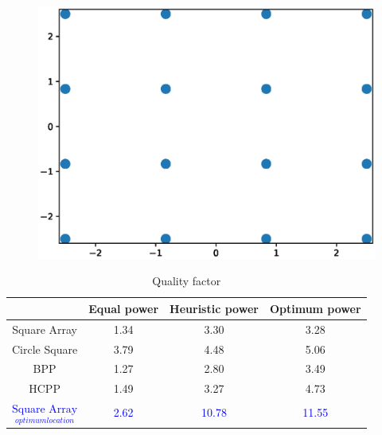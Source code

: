 \documentclass{beamer}
\theoremstyle{remark}
\begin{document}
\begin{frame}
\vfill
\begin{figure}
\includegraphics[scale=.25]{sq_opt_loc}
\end{figure}
\vfill
\begin{table}[]
\centering
\caption{Quality factor}
\begin{tabular}{|c|c|c|c|}
 \hline
 & Equal power & Heuristic power & Optimum power   \\
 \hline  
Square Array & 1.34 & 3.30 & 3.28   \\
 \hline 
Circle Square & 3.79 & 4.48 &  5.06 \\
 \hline
BPP & 1.27 & 2.80 &  3.49 \\
 \hline
HCPP  & 1.49  & 3.27 &  4.73 \\
 \hline
\textcolor{blue}{$\underset{optimum location}{\text{Square Array}}$} & \textcolor{blue}{2.62}  & \textcolor{blue}{10.78} &  \textcolor{blue}{11.55} \\
 \hline
\end{tabular}
\end{table}
\vfill
\end{frame}
\end{document}
